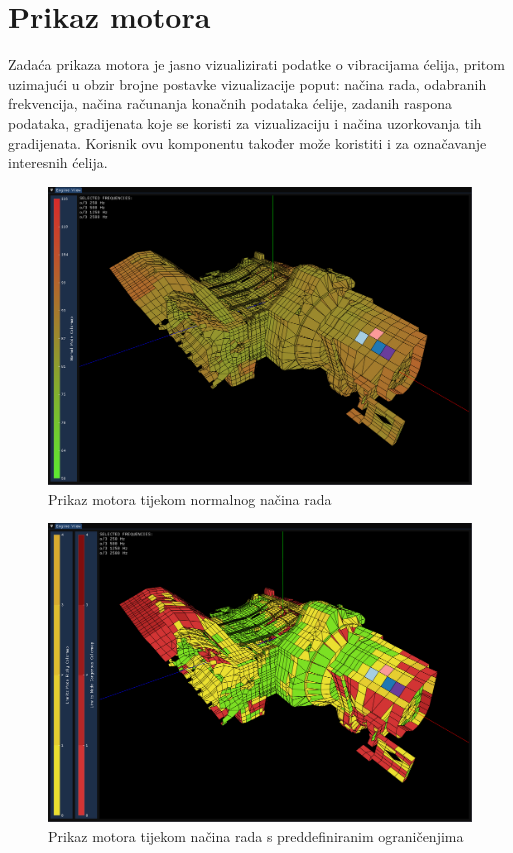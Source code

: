 \documentclass[times, utf8, diplomski]{fer}
\begin{document}
\section{Prikaz motora} \label{engine-view-section}
Zadaća prikaza motora je jasno vizualizirati podatke o vibracijama ćelija, pritom uzimajući u obzir brojne postavke vizualizacije poput: načina rada, odabranih frekvencija, načina računanja konačnih podataka ćelije, zadanih raspona podataka, gradijenata koje se koristi za vizualizaciju i načina uzorkovanja tih gradijenata. Korisnik ovu komponentu također može koristiti i za označavanje interesnih ćelija.\\
\begin{figure}[H]
\centering
\includegraphics[width=0.85\linewidth]{engine_view_normal_mode.png}
\caption{Prikaz motora tijekom normalnog načina rada}
\label{fig:normal-mode-engine-view}
\end{figure}
\begin{figure}[h]
\centering
\includegraphics[width=0.85\linewidth]{engine_view_limits.png}
\caption{Prikaz motora tijekom načina rada s preddefiniranim ograničenjima}
\label{fig:limits-mode-engine-view}
\end{figure}
\end{document}
